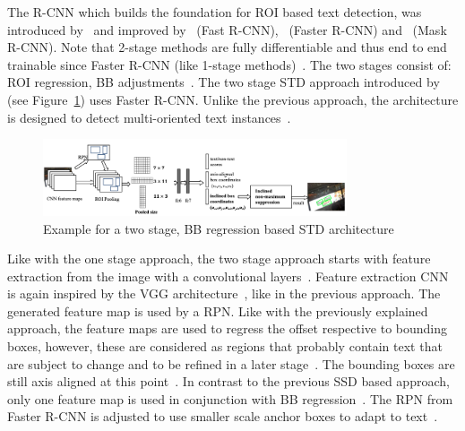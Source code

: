 The R-CNN which builds the foundation for \ac{ROI} based text detection, was introduced
by~\cite{girshick_rich_2014} and improved by~\cite{girshick_fast_2015} (Fast
R-CNN),~\cite{ren_faster_2015} (Faster R-CNN) and~\cite{he_mask_2018} (Mask R-CNN).
Note that 2-stage methods are fully differentiable and thus end to end trainable since
Faster R-CNN (like 1-stage methods)~\citep{ren_faster_2015,long_scene_2021}.
The two stages consist of: \ac{ROI} regression, \ac{BB}
adjustments~\citep{jiang_r2cnn_2017, ren_faster_2015}.
The two stage \ac{STD} approach introduced by~\cite{jiang_r2cnn_2017} (see
Figure~\ref{fig:STD-segfree-rcnn}) uses Faster R-CNN.%
Unlike the previous approach, the architecture is designed to detect multi-oriented text
instances~\citep{jiang_r2cnn_2017,liao_textboxes_2017}.
\begin{figure}[ht]
    \centering
    \includegraphics[width=0.8\textwidth]{img/STD-seg-free-Jiang-R2CNN-2017.png}
    \caption[Two stage, BB regression based STD architecture]{%
        Example for a two stage, BB regression based STD
        architecture~\citep{jiang_r2cnn_2017}\label{fig:STD-segfree-rcnn}
    }
\end{figure}
Like with the one stage approach, the two stage approach starts with feature extraction from the
image with a convolutional layers~\citep{jiang_r2cnn_2017}.
Feature extraction \ac{CNN} is again inspired by the VGG architecture~\citep{jiang_r2cnn_2017},
like in the previous approach.
The generated feature map is used by a \ac{RPN}.
Like with the previously explained approach, the feature maps are used to regress the offset
respective to bounding boxes, however, these are considered as regions that probably contain text
that are subject to change and to be refined in a later
stage~\citep{jiang_r2cnn_2017,lu_mimicdet_2020}.
The bounding boxes are still axis aligned at this point~\citep{jiang_r2cnn_2017}.
In contrast to the previous \ac{SSD} based approach, only one feature map is used in conjunction with
\ac{BB} regression~\citep{jiang_r2cnn_2017}.
The \ac{RPN} from Faster R-CNN is adjusted to use smaller scale anchor boxes to adapt to
text~\citep{jiang_r2cnn_2017}.
